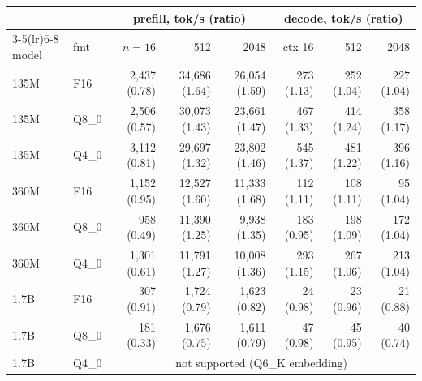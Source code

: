 \begin{tabular}{llrrrrrr}\toprule
 & & \multicolumn{3}{c}{prefill, tok/s (ratio)} & \multicolumn{3}{c}{decode, tok/s (ratio)}\\
\cmidrule(lr){3-5}\cmidrule(lr){6-8}
model & fmt & $n{=}16$ & 512 & 2048 & ctx 16 & 512 & 2048\\\midrule
135M & F16 & 2,437 (0.78) & 34,686 (1.64) & 26,054 (1.59) & 273 (1.13) & 252 (1.04) & 227 (1.04)\\
135M & Q8\_0 & 2,506 (0.57) & 30,073 (1.43) & 23,661 (1.47) & 467 (1.33) & 414 (1.24) & 358 (1.17)\\
135M & Q4\_0 & 3,112 (0.81) & 29,697 (1.32) & 23,802 (1.46) & 545 (1.37) & 481 (1.22) & 396 (1.16)\\

360M & F16 & 1,152 (0.95) & 12,527 (1.60) & 11,333 (1.68) & 112 (1.11) & 108 (1.11) & 95 (1.04)\\
360M & Q8\_0 & 958 (0.49) & 11,390 (1.25) & 9,938 (1.35) & 183 (0.95) & 198 (1.09) & 172 (1.04)\\
360M & Q4\_0 & 1,301 (0.61) & 11,791 (1.27) & 10,008 (1.36) & 293 (1.15) & 267 (1.06) & 213 (1.04)\\

1.7B & F16 & 307 (0.91) & 1,724 (0.79) & 1,623 (0.82) & 24 (0.98) & 23 (0.96) & 21 (0.88)\\
1.7B & Q8\_0 & 181 (0.33) & 1,676 (0.75) & 1,611 (0.79) & 47 (0.98) & 45 (0.95) & 40 (0.74)\\
1.7B & Q4\_0 & \multicolumn{6}{c}{not supported (Q6\_K embedding)}\\
\bottomrule\end{tabular}